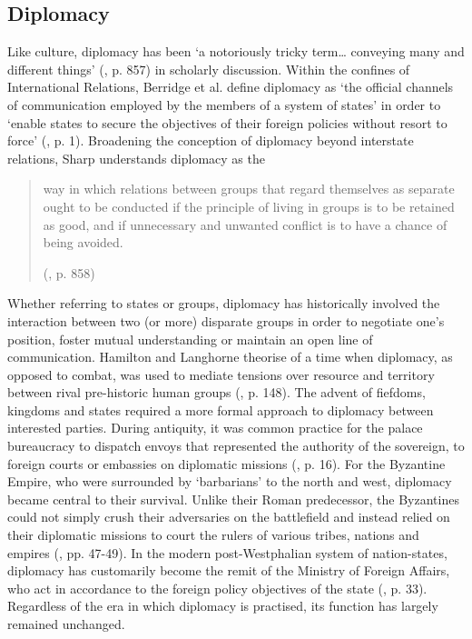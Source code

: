 \subsection{Diplomacy}

Like culture, diplomacy has been ‘a notoriously tricky term… conveying many and different things’ (\cite{sharp2003}, p. 857) in scholarly discussion. Within the confines of International Relations, Berridge et al. define diplomacy as ‘the official channels of communication employed by the members of a system of states’ in order to ‘enable states to secure the objectives of their foreign policies without resort to force’ (\citeyear{berridge2001}, p. 1). Broadening the conception of diplomacy beyond interstate relations, Sharp understands diplomacy as the 

\begin{quote}
    way in which relations between groups that regard themselves as separate ought to be conducted if the principle of living in groups is to be retained as good, and if unnecessary and unwanted conflict is to have a chance of being avoided. 
    
    \begin{flushright}
    (\cite{sharp2003}, p. 858)
    \end{flushright}
\end{quote}

Whether referring to states or groups, diplomacy has historically involved the interaction between two (or more) disparate groups in order to negotiate one’s position, foster mutual understanding or maintain an open line of communication. Hamilton and Langhorne theorise of a time when diplomacy, as opposed to combat, was used to mediate tensions over resource and territory between rival pre-historic human groups (\citeyear{hamiltonlanghorne2011}, p. 148). The advent of fiefdoms, kingdoms and states required a more formal approach to diplomacy between interested parties. During antiquity, it was common practice for the palace bureaucracy to dispatch envoys that represented the authority of the sovereign, to foreign courts or embassies on diplomatic missions (\cite{cohen2013}, p. 16). For the Byzantine Empire, who were surrounded by ‘barbarians’ to the north and west, diplomacy became central to their survival. Unlike their Roman predecessor, the Byzantines could not simply crush their adversaries on the battlefield and instead relied on their diplomatic missions to court the rulers of various tribes, nations and empires (\cite{jönssonhall2005}, pp. 47-49). In the modern post-Westphalian system of nation-states, diplomacy has customarily become the remit of the Ministry of Foreign Affairs, who act in accordance to the foreign policy objectives of the state (\cite{langhorne2000}, p. 33). Regardless of the era in which diplomacy is practised, its function has largely remained unchanged.

